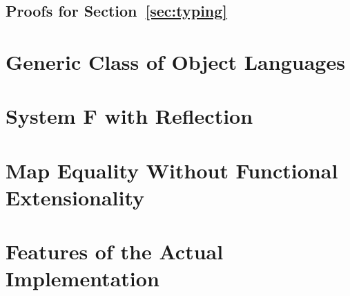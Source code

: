 \documentclass[sigplan,10pt, anonymous]{acmart}
\newenvironment{LibCode*}{%
  \begin{tcolorbox}[%
    colframe=white,%
    boxrule=0.0pt,%
    top=2.5pt,%
    left=2.5pt,%
    bottom=2.5pt,%
    right=2.5pt,%
    boxsep=0pt%
  ]\vspace{-0.2\baselineskip}%
}{%
  \vspace{-1\baselineskip}%
  \end{tcolorbox}%
}
\newcommand*\LibCode[1]{\begin{LibCode*}{#1}\end{LibCode*}}
\newcommand*\AppCode[1]{{#1}}
\begin{document}
  \LibCode\KDistLiftCompose
  \LibCode\KDistLiftComposeProof

  \LibCode\KCommLiftWeaken
  \LibCode\KCommLiftWeakenProof

  \LibCode\KCommLiftWeakenTraverse
  \LibCode\KCommLiftWeakenTraverseProof

  \LibCode\KWeakenCancelsSingle
  \LibCode\KWeakenCancelsSingleProof

  \LibCode\KWeakenCancelsSingleTraverse
  \LibCode\KWeakenCancelsSingleTraverseProof

  \LibCode\KDistLiftSingle
  \LibCode\KDistLiftSingleProof

  \LibCode\KDistLiftSingleTraverse
  \LibCode\KDistLiftSingleTraverseProof




  \subsection{Proofs for Section~\ref{sec:typing}}
  \LibCode\KLiftTyping
  \LibCode\KLiftTypingProof

  \LibCode\KSingleTyping
  \LibCode\KSingleTypingProof




  \section{Generic Class of Object Languages}
  \label{sec:generic-class}


  \section{System F with Reflection}
  \label{sec:reflection-example}


  \section{Map Equality Without Functional Extensionality}
  \label{sec:fun-ext}


  \section{Features of the Actual Implementation}
  \label{sec:features}
\end{document}
